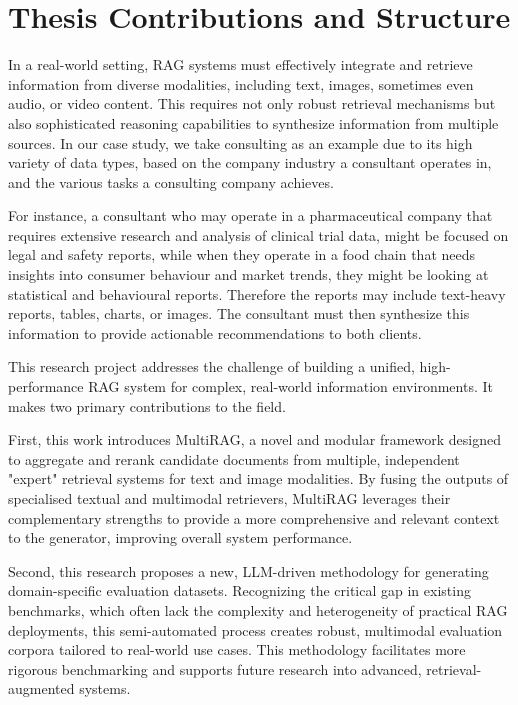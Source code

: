 \documentclass[12pt,twoside]{report}
\begin{document}
\section{Thesis Contributions and Structure}

In a real-world setting, RAG systems must effectively integrate and retrieve information from diverse modalities, including text, images, sometimes even audio, or video content. This requires not only robust retrieval mechanisms but also sophisticated reasoning capabilities to synthesize information from multiple sources. In our case study, we take consulting as an example due to its high variety of data types, based on the company industry a consultant operates in, and the various tasks a consulting company achieves.

For instance, a consultant who may operate in a pharmaceutical company that requires extensive research and analysis of clinical trial data, might be focused on legal and safety reports, while when they operate in a food chain that needs insights into consumer behaviour and market trends, they might be looking at statistical and behavioural reports. Therefore the reports may include text-heavy reports, tables, charts, or images. The consultant must then synthesize this information to provide actionable recommendations to both clients.

This research project addresses the challenge of building a unified, high-performance RAG system for complex, real-world information environments. It makes two primary contributions to the field.

First, this work introduces MultiRAG, a novel and modular framework designed to aggregate and rerank candidate documents from multiple, independent "expert" retrieval systems for text and image modalities. By fusing the outputs of specialised textual and multimodal retrievers, MultiRAG leverages their complementary strengths to provide a more comprehensive and relevant context to the generator, improving overall system performance.

Second, this research proposes a new, LLM-driven methodology for generating domain-specific evaluation datasets. Recognizing the critical gap in existing benchmarks, which often lack the complexity and heterogeneity of practical RAG deployments, this semi-automated process creates robust, multimodal evaluation corpora tailored to real-world use cases. This methodology facilitates more rigorous benchmarking and supports future research into advanced, retrieval-augmented systems.
\end{document}
